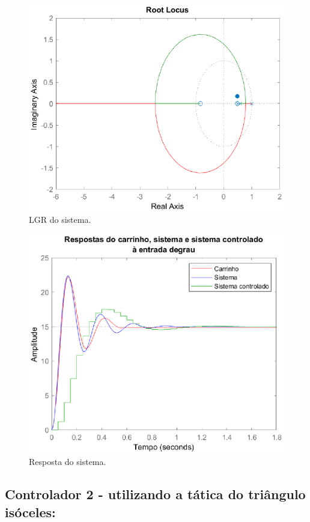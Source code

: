 \documentclass{article}
\begin{document}
\begin{figure}[H]
    \centering
        \includegraphics[width=.8\linewidth]{images/Matlab/identifica_03.eps}
        \caption{LGR do sistema.}\label{fig:lgr_controlador1}
\end{figure}
\begin{figure}[H]
    \centering
        \includegraphics[width=.8\linewidth]{images/Matlab/identifica_04.eps}
        \caption{Resposta do sistema.}\label{fig:resposta_controlador1}
\end{figure}

\subsection*{Controlador 2 - utilizando a tática do triângulo isóceles:}
\end{document}
